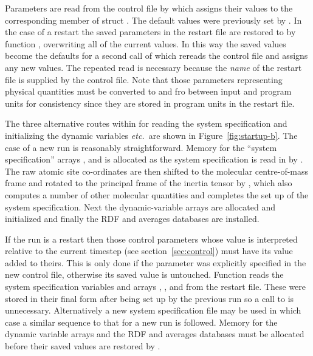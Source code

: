 \documentclass[a4paper,twoside]{report}
\newcommand{\etc}{\emph{etc.}}
\begin{document}
Parameters are read from the control file by 
which assigns their values to the corresponding member of struct
.  The default values were previously set by
.  In the case of a restart the saved
parameters in the restart file are restored to  by
function , overwriting all of the current
values.  In this way the saved values become the defaults for a second
call of  which rereads the control file and
assigns any new values.  The repeated read is
necessary because the \emph{name} of the restart file is supplied by
the control file.  Note that those parameters representing physical
quantities must be converted to and fro between input and program
units for consistency since they are stored in program units in the
restart file.

The three alternative routes within  for reading the
system specification and initializing the dynamic variables \etc\ are
shown in Figure~\ref{fig:startup-b}.  The case of a new run is
reasonably straightforward.  Memory for the ``system specification''
arrays ,  and  is
allocated as the system specification is read in by
.  The raw atomic site co-ordinates are then
shifted to the molecular centre-of-mass frame and rotated to the
principal frame of the inertia tensor by ,
which also computes a number of other molecular quantities and
completes the set up of the system specification. Next the
dynamic-variable arrays are allocated and initialized and finally the
RDF and averages databases are installed.

If the run is a restart then those control parameters whose value is
interpreted relative to the current timestep (see
section~\ref{sec:control}) must have its value added to theirs.  This
is only done if the parameter was explicitly specified in the new
control file, otherwise its saved value is untouched.  Function
 reads the system specification variables and
arrays , ,  and
 from the restart file.  These were stored in their
final form after being set up by the previous run so a call to
 is unnecessary.  Alternatively a new system
specification file may be used in which case a similar sequence to
that for a new run is followed.  Memory for the dynamic variable
arrays and the RDF and averages databases must be allocated before
their saved values are restored by .
\end{document}
